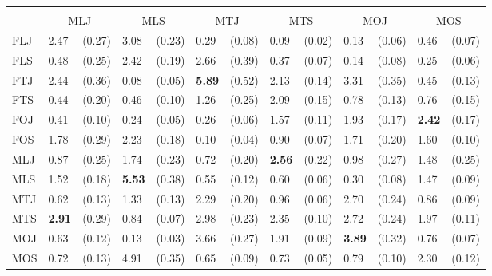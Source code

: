 \begin{tabular}{ll@{\,\,\,}rl@{\,\,\,}rl@{\,\,\,}rl@{\,\,\,}rl@{\,\,\,}rl@{\,\,\,}r}
\phantom{\textbf{Receiver}} &\\
    & \multicolumn{2}{c}{\textnormal{MLJ}}
    & \multicolumn{2}{c}{\textnormal{MLS}}
    & \multicolumn{2}{c}{\textnormal{MTJ}}
    & \multicolumn{2}{c}{\textnormal{MTS}}
    & \multicolumn{2}{c}{\textnormal{MOJ}}
    & \multicolumn{2}{c}{\textnormal{MOS}} \\
    \cmidrule(lr){2-3}
    \cmidrule(lr){4-5}
    \cmidrule(lr){6-7}
    \cmidrule(lr){8-9}
    \cmidrule(lr){10-11}
    \cmidrule(lr){12-13}
    \textnormal{FLJ} & 2.47 & (0.27) & 3.08 & (0.23) & 0.29 & (0.08) & 0.09 & (0.02) & 0.13 & (0.06) & 0.46 & (0.07) \\
    \textnormal{FLS} & 0.48 & (0.25) & 2.42 & (0.19) & 2.66 & (0.39) & 0.37 & (0.07) & 0.14 & (0.08) & 0.25 & (0.06) \\
    \textnormal{FTJ} & 2.44 & (0.36) & 0.08 & (0.05) & \textbf{5.89} & (0.52) & 2.13 & (0.14) & 3.31 & (0.35) & 0.45 & (0.13) \\
    \textnormal{FTS} & 0.44 & (0.20) & 0.46 & (0.10) & 1.26 & (0.25) & 2.09 & (0.15) & 0.78 & (0.13) & 0.76 & (0.15) \\
    \textnormal{FOJ} & 0.41 & (0.10) & 0.24 & (0.05) & 0.26 & (0.06) & 1.57 & (0.11) & 1.93 & (0.17) & \textbf{2.42} & (0.17) \\
    \textnormal{FOS} & 1.78 & (0.29) & 2.23 & (0.18) & 0.10 & (0.04) & 0.90 & (0.07) & 1.71 & (0.20) & 1.60 & (0.10) \\
    \textnormal{MLJ} & 0.87 & (0.25) & 1.74 & (0.23) & 0.72 & (0.20) & \textbf{2.56} & (0.22) & 0.98 & (0.27) & 1.48 & (0.25) \\
    \textnormal{MLS} & 1.52 & (0.18) & \textbf{5.53} & (0.38) & 0.55 & (0.12) & 0.60 & (0.06) & 0.30 & (0.08) & 1.47 & (0.09) \\
    \textnormal{MTJ} & 0.62 & (0.13) & 1.33 & (0.13) & 2.29 & (0.20) & 0.96 & (0.06) & 2.70 & (0.24) & 0.86 & (0.09) \\
    \textnormal{MTS} & \textbf{2.91} & (0.29) & 0.84 & (0.07) & 2.98 & (0.23) & 2.35 & (0.10) & 2.72 & (0.24) & 1.97 & (0.11) \\
    \textnormal{MOJ} & 0.63 & (0.12) & 0.13 & (0.03) & 3.66 & (0.27) & 1.91 & (0.09) & \textbf{3.89} & (0.32) & 0.76 & (0.07) \\
    \textnormal{MOS} & 0.72 & (0.13) & 4.91 & (0.35) & 0.65 & (0.09) & 0.73 & (0.05) & 0.79 & (0.10) & 2.30 & (0.12) \\
\bottomrule
\end{tabular}